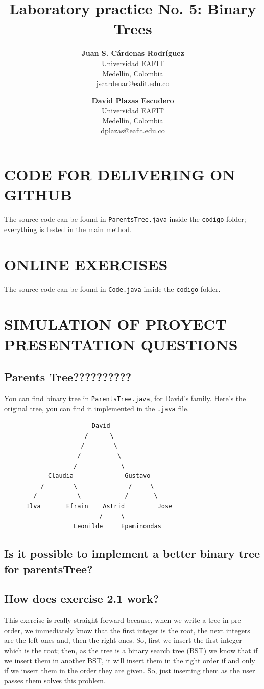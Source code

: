 \documentclass[a4paper,12pt]{article}
\title{\color{Eblue}\textbf{Laboratory practice No. 5: Binary Trees}}
\author{
  \textbf{Juan S. Cárdenas Rodríguez}\\
  Universidad EAFIT\\
  Medellín, Colombia\\
  jscardenar@eafit.edu.co
\and
  \textbf{David Plazas Escudero}\\
  Universidad EAFIT\\
  Medellín, Colombia\\
  dplazas@eafit.edu.co
}
\begin{document}
  \maketitle
  \thispagestyle{fancy}

  \section{CODE FOR DELIVERING ON GITHUB}
  The source code can be found in \texttt{ParentsTree.java} inside the \texttt{codigo} folder;
  everything is tested in the main method.

  \section{ONLINE EXERCISES}
  The source code can be found in \texttt{Code.java} inside the \texttt{codigo} folder.

  \section{SIMULATION OF PROYECT PRESENTATION QUESTIONS}
    \subsection{Parents Tree??????????}
      You can find binary tree in \texttt{ParentsTree.java}, for David's family.
      Here's the original tree, you can find it implemented in the \texttt{.java} file.
      \begin{Verbatim}
                        David
                      /      \
                     /        \
                    /          \
                   /            \
            Claudia              Gustavo
          /        \              /     \
        /           \            /       \
      Ilva       Efrain    Astrid         Jose
                          /     \
                   Leonilde     Epaminondas
      \end{Verbatim}

    \subsection{Is it possible to implement a better binary tree for parentsTree?}

    \subsection{How does exercise 2.1 work?}
    This exercise is really straight-forward because, when we write a tree in
    pre-order, we immediately know that the first integer is the root, the next
    integers are the left ones and, then the right ones. So, first we insert the
    first integer which is the root; then, as the tree is a binary search tree (BST)
    we know that if we insert them in another BST, it will insert them in the right
    order if and only if we insert them in the order they are given. So, just
    inserting them as the user passes them solves this problem.
\end{document}

